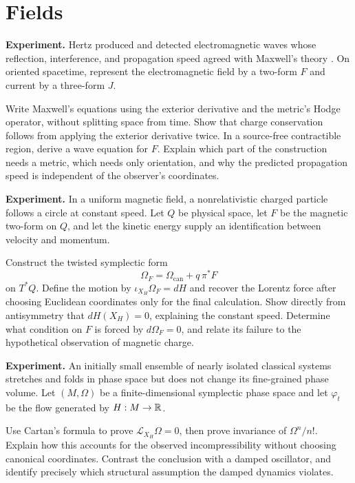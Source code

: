 \section{Fields}

\begin{exercise}
\textbf{Experiment.}
Hertz produced and detected electromagnetic waves whose reflection,
interference, and propagation speed agreed with Maxwell's theory
\cite{hertz}.  On oriented spacetime, represent the electromagnetic field by
a two-form \(F\) and current by a three-form \(J\).

Write Maxwell's equations using the exterior derivative and the metric's
Hodge operator, without splitting space from time.  Show that charge
conservation follows from applying the exterior derivative twice.  In a
source-free contractible region, derive a wave equation for \(F\).  Explain
which part of the construction needs a metric, which needs only orientation,
and why the predicted propagation speed is independent of the observer's
coordinates.
\end{exercise}

\begin{exercise}
\textbf{Experiment.}
In a uniform magnetic field, a nonrelativistic charged particle follows a
circle at constant speed.  Let \(Q\) be physical space, let \(F\) be the
magnetic two-form on \(Q\), and let the kinetic energy supply an identification
between velocity and momentum.

Construct the twisted symplectic form
\[
        \Omega_F=\Omega_{\mathrm{can}}+q\,\pi^*F
\]
on \(T^*Q\).  Define the motion by
\(\iota_{X_H}\Omega_F=dH\) and recover the Lorentz force after choosing
Euclidean coordinates only for the final calculation.  Show directly from
antisymmetry that \(dH(X_H)=0\), explaining the constant speed.  Determine
what condition on \(F\) is forced by \(d\Omega_F=0\), and relate its failure to
the hypothetical observation of magnetic charge.
\end{exercise}

\begin{exercise}
\textbf{Experiment.}
An initially small ensemble of nearly isolated classical systems stretches
and folds in phase space but does not change its fine-grained phase volume.
Let \((M,\Omega)\) be a finite-dimensional symplectic phase space and let
\(\varphi_t\) be the flow generated by \(H:M\to\mathbb R\).

Use Cartan's formula to prove
\(\mathcal L_{X_H}\Omega=0\), then prove invariance of
\(\Omega^n/n!\).  Explain how this accounts for the observed incompressibility
without choosing canonical coordinates.  Contrast the conclusion with a
damped oscillator, and identify precisely which structural assumption the
damped dynamics violates.
\end{exercise}


